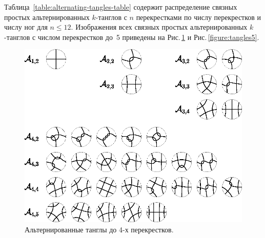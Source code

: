 \documentclass[12pt]{article}
\theoremstyle{plain}
\theoremstyle{definition}
\def\figureref#1{Рис.\,\protect\ref{#1}}
\begin{document}
		Таблица~\ref{table:alternating-tangles-table} содержит распределение связных простых альтернированных $k$-танглов с $n$
		перекрестками по числу перекрестков и числу ног для $n \le 12$. Изображения всех связных простых альтернированных $k$-танглов
		с числом перекрестков до~5 приведены на \figureref{figure:tangles14} и \figureref{figure:tangles5}.

		\begin{figure}[ht]
			\centering
			\includegraphics[scale=0.8]{c/alternating-tangles-1-4.eps}
			\caption{\footnotesize Альтернированные танглы до 4-х перекрестков.\label{figure:tangles14}}
		\end{figure}
\end{document}

